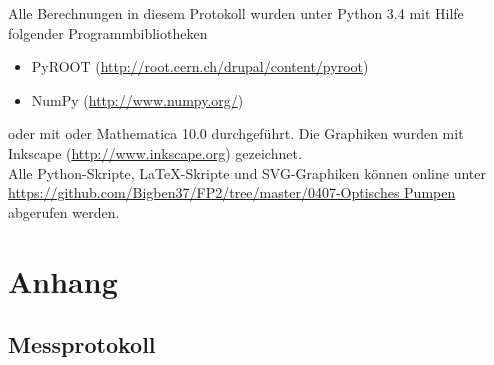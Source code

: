 \documentclass[12pt, a4paper]{scrartcl}
\title{\exptitle}
\subtitle{Fortgeschrittenen-Praktikum 2}
\author{Moritz Bitterling und Benjamin Rottler \\ Universität Freiburg}
\date{\expdate}
\numberwithin{equation}{section} %
\numberwithin{table}{section}    %
\begin{document}
\hypersetup{pageanchor=false} %

\thispagestyle{empty}

\newpage
Alle Berechnungen in diesem Protokoll wurden unter Python 3.4 mit Hilfe folgender Programmbibliotheken
\begin{itemize}
  \item PyROOT (\url{http://root.cern.ch/drupal/content/pyroot})
  \item NumPy (\url{http://www.numpy.org/})
\end{itemize}
oder mit oder Mathematica 10.0 durchgeführt.
Die Graphiken wurden mit Inkscape (\url{http://www.inkscape.org}) gezeichnet.\\[\baselineskip]
Alle Python-Skripte, \LaTeX-Skripte und SVG-Graphiken können online unter \\
\url{https://github.com/Bigben37/FP2/tree/master/0407-Optisches Pumpen} abgerufen werden. 
\thispagestyle{empty}

\newpage
\tableofcontents
\thispagestyle{empty}

\newpage
\hypersetup{pageanchor=true} %
\setcounter{page}{1} %

 









\newpage



\appendix
\section{Anhang}
\subsection{Messprotokoll}

\end{document}
